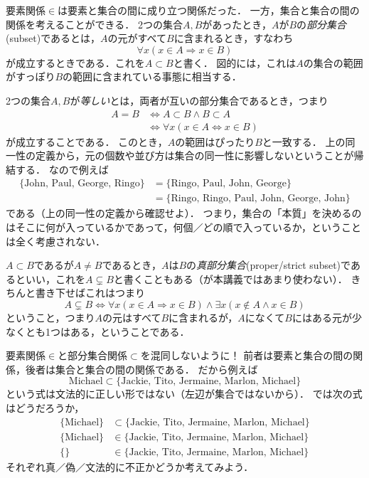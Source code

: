 \documentclass[11pt,a4paper]{jsarticle}
\begin{document}
要素関係$\in$は要素と集合の間に成り立つ関係だった．
一方，集合と集合の間の関係を考えることができる．
2つの集合$A, B$があったとき，$A$が$B$の\emph{部分集合}(subset)であるとは，$A$の元がすべて$B$に含まれるとき，すなわち
\[
 \forall x (x \in A \Rightarrow x \in B)
\]
が成立するときである．これを$A \subset B$と書く．
図的には，これは$A$の集合の範囲がすっぽり$B$の範囲に含まれている事態に相当する．

2つの集合$A,B$が\emph{等しい}とは，両者が互いの部分集合であるとき，つまり
\begin{align*}
 A = B &\iff A \subset B \wedge B \subset A \\
&\iff \forall x (x \in A \iff x \in B)
\end{align*}
 が成立することである．
このとき，$A$の範囲はぴったり$B$と一致する．
上の同一性の定義から，{元の個数や並び方は集合の同一性に影響しない}ということが帰結する．
なので例えば
\begin{align*}
 \{\text{John, Paul, George, Ringo}\} 
 &= \{\text{Ringo, Paul, John, George}\} \\
 &= \{\text{Ringo, Ringo, Paul, John, George, John}\}
\end{align*}
である（上の同一性の定義から確認せよ）．
つまり，集合の「本質」を決めるのはそこに何が入っているかであって，何個／どの順で入っているか，ということは全く考慮されない．

$A \subset B$であるが$A \neq B$であるとき，$A$は$B$の\emph{真部分集合}(proper/strict subset)であるといい，これを$A \subsetneq B$と書くこともある（が本講義ではあまり使わない）．
きちんと書き下せばこれはつまり
\[
A \subsetneq B \iff \forall x (x \in A \Rightarrow x \in B) \wedge \exists x (x \not\in A \wedge x \in B)
\]
ということ，つまり$A$の元はすべて$B$に含まれるが，$A$になくて$B$にはある元が少なくとも1つはある，ということである．


\begin{attn}
要素関係$\in$と部分集合関係$\subset$を混同しないように！
前者は要素と集合の間の関係，後者は集合と集合の間の関係である．
だから例えば
\[
\text{Michael} \subset \{ \text{Jackie, Tito, Jermaine, Marlon, Michael}\}  
\]
という式は文法的に正しい形ではない（左辺が集合ではないから）．
では次の式はどうだろうか，
\begin{align*}
\{ \text{Michael} \} &\subset \{ \text{Jackie, Tito, Jermaine, Marlon, Michael}\}  \\
\{ \text{Michael} \} &\in \{ \text{Jackie, Tito, Jermaine, Marlon, Michael}\}  \\
\{  \} &\in \{ \text{Jackie, Tito, Jermaine, Marlon, Michael}\}  
\end{align*}
それぞれ真／偽／文法的に不正かどうか考えてみよう．
\end{attn}
\end{document}
